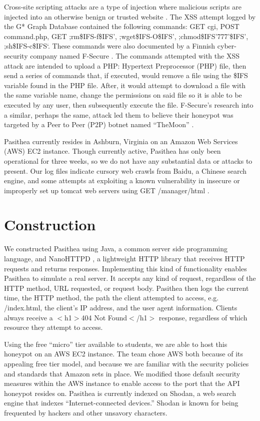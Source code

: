 \documentclass[10pt, conference]{IEEEtran}
\begin{document}
Cross-site scripting attacks are a type of injection where malicious scripts are injected into an otherwise benign or trusted website \cite{XSS-Def}. The XSS attempt logged by the G* Graph Database contained the following commands: GET cgi, POST command.php, GET ;rm\$IFS-f\$IFS’, ;wget\$IFS-O\$IFS’, ;chmod\$IFS’777’\$IFS’, ;sh\$IFS-c\$IFS‘. These commands were also documented by a Finnish cyber-security company named F-Secure \cite{F-Secure}. The commands attempted with the XSS attack are intended to upload a PHP: Hypertext Preprocessor (PHP) file, then send a series of commands that, if executed, would remove a file using the \$IFS variable found in the PHP file. After, it would attempt to download a file with the same variable name, change the permissions on said file so it is able to be executed by any user, then subsequently execute the file. F-Secure’s research into a similar, perhaps the same, attack led them to believe their honeypot was targeted by a Peer to Peer (P2P) botnet named “TheMoon” \cite{TheMoon}.

Pasithea currently resides in Ashburn, Virginia on an Amazon Web Services (AWS) EC2 instance. Though currently active, Pasithea has only been operational for three weeks, so we do not have any substantial data or attacks to present. Our log files indicate cursory web crawls from Baidu, a Chinese search engine, and some attempts at exploiting a known vulnerability in insecure or improperly set up tomcat web servers using GET /manager/html \cite{Tomcat-Exploit}.

\section{Construction}
\label{construct}
We constructed Pasithea using Java, a common server side programming language, and  NanoHTTPD \cite{Nanohttpd}, a lightweight HTTP library that receives HTTP requests and returns responses. Implementing this kind of functionality enables Pasithea to simulate a real server. It accepts any kind of request, regardless of the HTTP method, URL requested, or request body. Pasithea then logs the current time, the HTTP method, the path the client attempted to access, e.g. /index.html, the client’s IP address, and the user agent information. Clients always receive a $<$h1$>$404 Not Found$<$/h1$>$ response, regardless of which resource they attempt to access. 

Using the free “micro” tier available to students, we are able to host this honeypot on an AWS EC2 instance. The team chose AWS both because of its appealing free tier model, and because we are familiar with the security policies and standards that Amazon sets in place. We modified those default security measures within the AWS instance to enable access to the port that the API honeypot resides on. Pasithea is currently indexed on Shodan, a web search engine that indexes “Internet-connected devices.” Shodan is known for being frequented by hackers and other unsavory characters\cite{unsavoryChar}.
\end{document}

